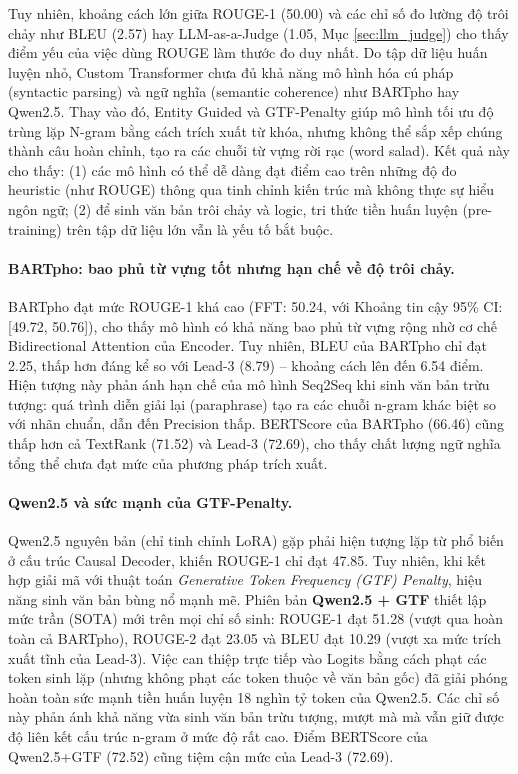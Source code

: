 \documentclass{article}
\begin{document}
Tuy nhiên, khoảng cách lớn giữa ROUGE-1 (50.00) và các chỉ số đo lường độ trôi chảy như BLEU (2.57) hay LLM-as-a-Judge (1.05, Mục \ref{sec:llm_judge}) cho thấy điểm yếu của việc dùng ROUGE làm thước đo duy nhất. Do tập dữ liệu huấn luyện nhỏ, Custom Transformer chưa đủ khả năng mô hình hóa cú pháp (syntactic parsing) và ngữ nghĩa (semantic coherence) như BARTpho hay Qwen2.5. Thay vào đó, Entity Guided và GTF-Penalty giúp mô hình tối ưu độ trùng lặp N-gram bằng cách trích xuất từ khóa, nhưng không thể sắp xếp chúng thành câu hoàn chỉnh, tạo ra các chuỗi từ vựng rời rạc (word salad). Kết quả này cho thấy: (1) các mô hình có thể dễ dàng đạt điểm cao trên những độ đo heuristic (như ROUGE) thông qua tinh chỉnh kiến trúc mà không thực sự hiểu ngôn ngữ; (2) để sinh văn bản trôi chảy và logic, tri thức tiền huấn luyện (pre-training) trên tập dữ liệu lớn vẫn là yếu tố bắt buộc.

\paragraph{BARTpho: bao phủ từ vựng tốt nhưng hạn chế về độ trôi chảy.}
BARTpho đạt mức ROUGE-1 khá cao (FFT: 50.24, với Khoảng tin cậy 95\% CI: [49.72, 50.76]), cho thấy mô hình có khả năng bao phủ từ vựng rộng nhờ cơ chế Bidirectional Attention của Encoder. Tuy nhiên, BLEU của BARTpho chỉ đạt 2.25, thấp hơn đáng kể so với Lead-3 (8.79) -- khoảng cách lên đến 6.54 điểm. Hiện tượng này phản ánh hạn chế của mô hình Seq2Seq khi sinh văn bản trừu tượng: quá trình diễn giải lại (paraphrase) tạo ra các chuỗi n-gram khác biệt so với nhãn chuẩn, dẫn đến Precision thấp. BERTScore của BARTpho (66.46) cũng thấp hơn cả TextRank (71.52) và Lead-3 (72.69), cho thấy chất lượng ngữ nghĩa tổng thể chưa đạt mức của phương pháp trích xuất.

\paragraph{Qwen2.5 và sức mạnh của GTF-Penalty.}
Qwen2.5 nguyên bản (chỉ tinh chỉnh LoRA) gặp phải hiện tượng lặp từ phổ biến ở cấu trúc Causal Decoder, khiến ROUGE-1 chỉ đạt 47.85. Tuy nhiên, khi kết hợp giải mã với thuật toán \textit{Generative Token Frequency (GTF) Penalty}, hiệu năng sinh văn bản bùng nổ mạnh mẽ. Phiên bản \textbf{Qwen2.5 + GTF} thiết lập mức trần (SOTA) mới trên mọi chỉ số sinh: ROUGE-1 đạt 51.28 (vượt qua hoàn toàn cả BARTpho), ROUGE-2 đạt 23.05 và BLEU đạt 10.29 (vượt xa mức trích xuất tĩnh của Lead-3). Việc can thiệp trực tiếp vào Logits bằng cách phạt các token sinh lặp (nhưng không phạt các token thuộc về văn bản gốc) đã giải phóng hoàn toàn sức mạnh tiền huấn luyện 18 nghìn tỷ token của Qwen2.5. Các chỉ số này phản ánh khả năng vừa sinh văn bản trừu tượng, mượt mà mà vẫn giữ được độ liên kết cấu trúc n-gram ở mức độ rất cao. Điểm BERTScore của Qwen2.5+GTF (72.52) cũng tiệm cận mức của Lead-3 (72.69).
\end{document}
